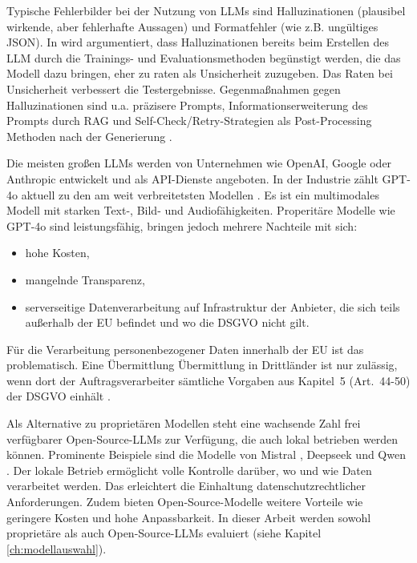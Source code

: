 Typische Fehlerbilder bei der Nutzung von \acp{LLM} sind Halluzinationen (plausibel wirkende, aber fehlerhafte Aussagen) und Formatfehler (wie z.B. ungültiges JSON). In \cite{kalai2025languagemodelshallucinate} wird argumentiert, dass Halluzinationen bereits beim Erstellen des \ac{LLM} durch die Trainings- und Evaluationsmethoden begünstigt werden, die das Modell dazu bringen, eher zu raten als Unsicherheit zuzugeben. Das Raten bei Unsicherheit verbessert die Testergebnisse. Gegenmaßnahmen gegen Halluzinationen sind u.a. präzisere Prompts, Informationserweiterung des Prompts durch \ac{RAG} und Self-Check/Retry-Strategien als Post-Processing Methoden nach der Generierung \cite{ji2023hallucinationsurvey}.

Die meisten großen \acp{LLM} werden von Unternehmen wie OpenAI, Google oder Anthropic entwickelt und als API-Dienste angeboten. In der Industrie zählt GPT-4o aktuell zu den am weit verbreitetsten Modellen \cite{openai-hello-gpt-4o}. Es ist ein multimodales Modell mit starken Text-, Bild- und Audiofähigkeiten. Properitäre Modelle wie GPT-4o sind leistungsfähig, bringen jedoch mehrere Nachteile mit sich:

\begin{itemize}
    \item hohe Kosten,
    \item mangelnde Transparenz,
    \item serverseitige Datenverarbeitung auf Infrastruktur der Anbieter, die sich teils außerhalb der \ac{EU} befindet und wo die \ac{DSGVO} nicht gilt.
\end{itemize}

Für die Verarbeitung personenbezogener Daten innerhalb der EU ist das problematisch. Eine Übermittlung Übermittlung in Drittländer ist nur zulässig, wenn dort der Auftragsverarbeiter sämtliche Vorgaben aus Kapitel~5 (Art.~44-50) der \ac{DSGVO} einhält \cite{GDPR2016}.

Als Alternative zu proprietären Modellen steht eine wachsende Zahl frei verfügbarer Open-Source-\acp{LLM} zur Verfügung, die auch lokal betrieben werden können. Prominente Beispiele sind die Modelle von Mistral \cite{mistralai}, Deepseek \cite{deepseek} und Qwen \cite{qwen}. Der lokale Betrieb ermöglicht volle Kontrolle darüber, wo und wie Daten verarbeitet werden. Das erleichtert die Einhaltung datenschutzrechtlicher Anforderungen. Zudem bieten Open-Source-Modelle weitere Vorteile wie geringere Kosten und hohe Anpassbarkeit. In dieser Arbeit werden sowohl proprietäre als auch Open-Source-\acp{LLM} evaluiert (siehe Kapitel \ref{ch:modellauswahl}).